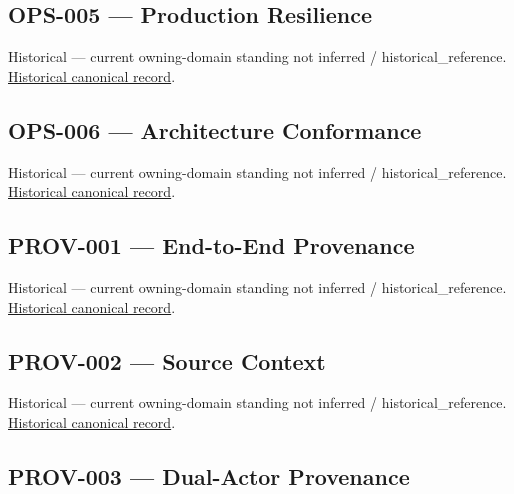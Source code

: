 \subsection{OPS-005 — Production Resilience}

\par\label{element:01e7d6168d554048a424ef75a6556040}
Historical — current owning-domain standing not inferred / historical\_reference. \href{../../../../continuum/motivation/requirement/01e7d6168d554048a424ef75a6556040.md}{Historical canonical record}.\par

\subsection{OPS-006 — Architecture Conformance}

\par\label{element:dee1792d83bf413f974fc24802084872}
Historical — current owning-domain standing not inferred / historical\_reference. \href{../../../../continuum/motivation/requirement/dee1792d83bf413f974fc24802084872.md}{Historical canonical record}.\par

\subsection{PROV-001 — End-to-End Provenance}

\par\label{element:3e45e60affb44bf384d54de26d3add6a}
Historical — current owning-domain standing not inferred / historical\_reference. \href{../../../../continuum/motivation/requirement/3e45e60affb44bf384d54de26d3add6a.md}{Historical canonical record}.\par

\subsection{PROV-002 — Source Context}

\par\label{element:929ed42779a843dd84b683e3dcc35eb3}
Historical — current owning-domain standing not inferred / historical\_reference. \href{../../../../continuum/motivation/requirement/929ed42779a843dd84b683e3dcc35eb3.md}{Historical canonical record}.\par

\subsection{PROV-003 — Dual-Actor Provenance}

